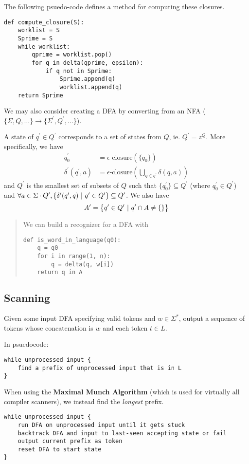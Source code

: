 \documentclass[12pt]{article}
\begin{document}
The following psuedo-code defines a method for computing these closures.

\begin{verbatim}
def compute_closure(S):
    worklist = S
    Sprime = S
    while worklist:
        qprime = worklist.pop()
        for q in delta(qprime, epsilon):
            if q not in Sprime:
                Sprime.append(q)
                worklist.append(q)
    return Sprime
\end{verbatim}

We may also consider creating a DFA by converting from an NFA ($\{\Sigma, Q, \dots\} \to \{\Sigma^\prime, Q^\prime, \dots\}$).

A state of $q^\prime \in Q^\prime$ corresponds to a set of states from $Q$, ie. $Q^\prime = z^Q$. More specifically, we have
\begin{align*}
q_0^\prime &= \epsilon\text{-closure}(\{q_0\}) \\
\delta^\prime (q^\prime, a) &= \epsilon\text{-closure}(\displaystyle\bigcup_{q \in q^\prime} \delta(q, a))
\end{align*}
and $Q^\prime$ is the smallest set of subsets of $Q$ such that $\{q_0^\prime\} \subseteq Q^\prime$ (where $q_0^\prime \in Q^\prime$) and $\forall a \in \Sigma \cdot Q^\prime, \{\delta^\prime(q^\prime, q) \ |\  q^\prime \in Q^\prime\} \subseteq Q^\prime$. We also have \[ A^\prime = \bigl\{q^\prime \in Q^\prime \ |\  q^\prime \cap A \neq \{\}\bigl\} \]

\begin{quote}
We can build a recognizer for a DFA with
\begin{verbatim}
def is_word_in_language(q0):
    q = q0
    for i in range(1, n):
        q = delta(q, w[i])
    return q in A
\end{verbatim}
\end{quote}

\subsection{Scanning}
Given some input DFA specifying valid tokens and $w \in \Sigma^*$, output a sequence of tokens whose concatenation is $w$ and each token $t \in L$.

In psuedocode:
\begin{verbatim}
while unprocessed input {
    find a prefix of unprocessed input that is in L
}
\end{verbatim}

When using the {\bf Maximal Munch Algorithm} (which is used for virtually all compiler scanners), we instead find the \textit{longest} prefix.
\begin{verbatim}
while unprocessed input {
    run DFA on unprocessed input until it gets stuck
    backtrack DFA and input to last-seen accepting state or fail
    output current prefix as token
    reset DFA to start state
}
\end{verbatim}
\end{document}
